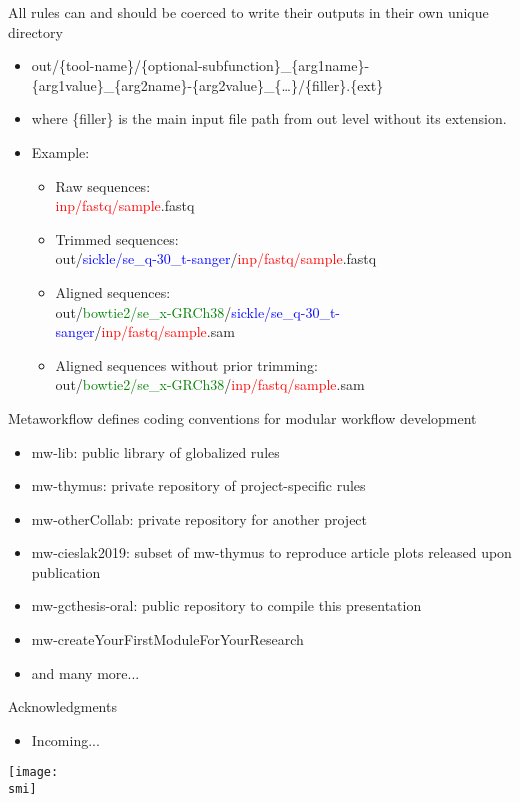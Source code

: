 \documentclass[10pt]{beamer}
\def\smi{out/ln/updir/mw-gcthesis-oral/library.bib}
\begin{document}
\begin{frame}{All rules can and should be coerced to write their outputs in their own unique directory}
  \begin{itemize}
    \item out/\{tool-name\}/\{optional-subfunction\}\_\{arg1name\}-\{arg1value\}\_\{arg2name\}-\{arg2value\}\_\{\ldots\}/\{filler\}.\{ext\}
    \item where \{filler\} is the main input file path from out level without its extension.
    \item Example:
      \begin{itemize}
        \item Raw sequences:\\
          \textcolor{red}{inp/fastq/sample}.fastq
        \item Trimmed sequences:\\
          out/\textcolor{blue}{sickle/se\_q-30\_t-sanger}/\textcolor{red}{inp/fastq/sample}.fastq
        \item Aligned sequences:\\
          out/\textcolor{green}{bowtie2/se\_x-GRCh38}/\textcolor{blue}{sickle/se\_q-30\_t-sanger}/\textcolor{red}{inp/fastq/sample}.sam
        \item Aligned sequences without prior trimming:\\
          out/\textcolor{green}{bowtie2/se\_x-GRCh38}/\textcolor{red}{inp/fastq/sample}.sam
      \end{itemize}
  \end{itemize}
\end{frame}
\begin{frame}{Metaworkflow defines coding conventions for modular workflow development}
  \begin{itemize}
    \item mw-lib: public library of globalized rules
    \item mw-thymus: private repository of project-specific rules
    \item mw-otherCollab: private repository for another project
    \item mw-cieslak2019: subset of mw-thymus to reproduce article plots released upon publication
    \item mw-gcthesis-oral: public repository to compile this presentation
    \item mw-createYourFirstModuleForYourResearch
    \item and many more...
  \end{itemize}
\end{frame}
\begin{frame}{Acknowledgments}
  \begin{itemize}
    \item Incoming...
  \end{itemize}
\end{frame}
  \begin{frame}[plain]
  \def\smi{out/wget/https/imgs.xkcd.com/comics/thesis_defense.png}
  \texttt{[image: \\smi]}%
\end{frame}
\end{document}
